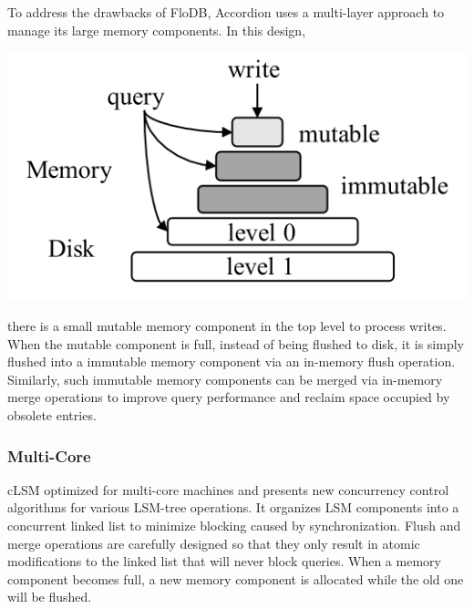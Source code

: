 \documentclass[11pt]{article}
\begin{document}
To address the drawbacks of FloDB, Accordion uses a multi-layer approach to manage its large memory
components. In this design,
\begin{center}
\includegraphics[width=.8\textwidth]{../../images/db/11.png}
\end{center}
there is a small mutable memory component in the top level to process writes. When the mutable
component is full, instead of being flushed to disk, it is simply flushed into a immutable memory
component via an in-memory flush operation. Similarly, such immutable memory components can be merged
via in-memory merge operations to improve query performance and reclaim space occupied by obsolete entries.
\subsubsection{Multi-Core}
\label{sec:org7684a76}
cLSM\cite{10.1145/2741948.2741973} optimized for multi-core machines and presents new concurrency control algorithms for various
LSM-tree operations. It organizes LSM components into a concurrent linked list to minimize blocking
caused by synchronization. Flush and merge operations are carefully designed so that they only result
in atomic modifications to the linked list that will never block queries. When a memory component
becomes full, a new memory component is allocated while the old one will be flushed.
\end{document}
